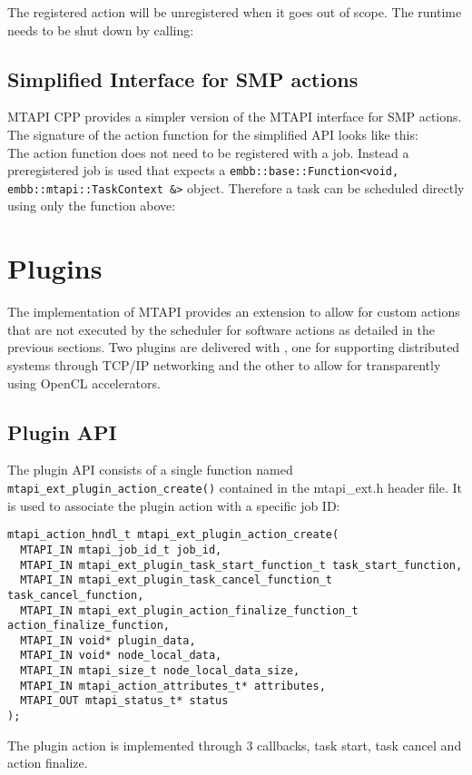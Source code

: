 The registered action will be unregistered when it goes out of scope.
The runtime needs to be shut down by calling:
\\

\subsection{Simplified Interface for SMP actions}

MTAPI CPP provides a simpler version of the MTAPI interface for SMP actions. The signature of the
action function for the simplified API looks like this:
%
\\
%
The action function does not need to be registered with a job. Instead a preregistered job is used that expects a \lstinline|embb::base::Function<void, embb::mtapi::TaskContext &>| object. Therefore a task can be scheduled directly using only the function above:
%
\\
%


\section{Plugins}

The \embb implementation of MTAPI provides an extension to allow for custom actions that are not executed by the scheduler for software actions as detailed in the previous sections.
Two plugins are delivered with \embb, one for supporting distributed systems through TCP/IP networking and the other to allow for transparently using OpenCL accelerators.

\subsection{Plugin API}

The plugin API consists of a single function named \lstinline|mtapi_ext_plugin_action_create()| contained in the mtapi\_ext.h header file. It is used to associate the plugin action with a specific job ID:
\begin{lstlisting}
mtapi_action_hndl_t mtapi_ext_plugin_action_create(
  MTAPI_IN mtapi_job_id_t job_id,
  MTAPI_IN mtapi_ext_plugin_task_start_function_t task_start_function,
  MTAPI_IN mtapi_ext_plugin_task_cancel_function_t task_cancel_function,
  MTAPI_IN mtapi_ext_plugin_action_finalize_function_t action_finalize_function,
  MTAPI_IN void* plugin_data,
  MTAPI_IN void* node_local_data,
  MTAPI_IN mtapi_size_t node_local_data_size,
  MTAPI_IN mtapi_action_attributes_t* attributes,
  MTAPI_OUT mtapi_status_t* status
);
\end{lstlisting}
The plugin action is implemented through 3 callbacks, task start, task cancel and action finalize.

